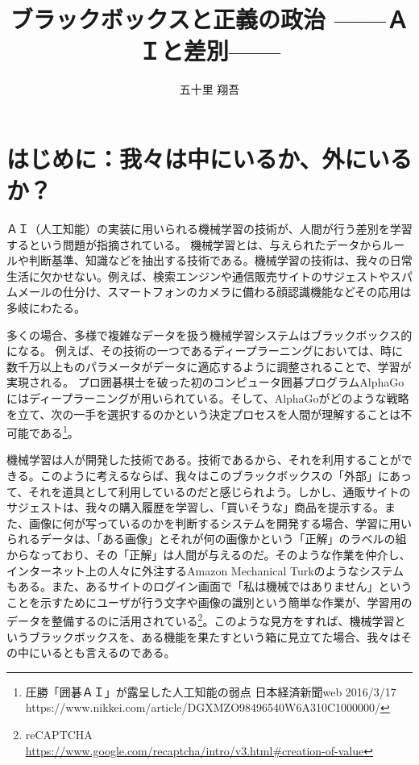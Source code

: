 \documentclass[b5j,twoside,twocolumn]{utarticle}
\title{ブラックボックスと正義の政治 ------ＡＩと差別------}
\author{五十里 翔吾}
\date{\vspace{-5mm}}
\begin{document}

\maketitle


\setlength{\footskip}{-2mm}
\chead[]{}
\lfoot[]{\thepage{}}
\cfoot[]{}
\rfoot[\thepage{}]{}

\thispagestyle{fancy}
\renewcommand{\footnoterule}{\noindent\rule{100mm}{0.3mm}\vskip2mm}


\section{はじめに：我々は中にいるか、外にいるか？}
ＡＩ（人工知能）の実装に用いられる機械学習の技術が、人間が行う差別を学習するという問題が指摘されている。
機械学習とは、与えられたデータからルールや判断基準、知識などを抽出する技術である。機械学習の技術は、我々の日常生活に欠かせない。例えば、検索エンジンや通信販売サイトのサジェストやスパムメールの仕分け、スマートフォンのカメラに備わる顔認識機能などその応用は多岐にわたる。


多くの場合、多様で複雑なデータを扱う機械学習システムはブラックボックス的になる。
例えば、その技術の一つであるディープラーニングにおいては、時に数千万以上ものパラメータがデータに適応するように調整されることで、学習が実現される。
プロ囲碁棋士を破った初のコンピュータ囲碁プログラムAlphaGoにはディープラーニングが用いられている。そして、AlphaGoがどのような戦略を立て、次の一手を選択するのかという決定プロセスを人間が理解することは不可能である\footnote{圧勝「囲碁ＡＩ」が露呈した人工知能の弱点 日本経済新聞web 2016/3/17 https://www.nikkei.com/article/DGXMZO98496540W6A310C1000000/}。


機械学習は人が開発した技術である。技術であるから、それを利用することができる。このように考えるならば、我々はこのブラックボックスの「外部」にあって、それを道具として利用しているのだと感じられよう。しかし、通販サイトのサジェストは、我々の購入履歴を学習し、「買いそうな」商品を提示する。また、画像に何が写っているのかを判断するシステムを開発する場合、学習に用いられるデータは、「ある画像」とそれが何の画像かという「正解」のラベルの組からなっており、その「正解」は人間が与えるのだ。そのような作業を仲介し、インターネット上の人々に外注するAmazon Mechanical Turkのようなシステムもある。また、あるサイトのログイン画面で「私は機械ではありません」ということを示すためにユーザが行う文字や画像の識別という簡単な作業が、学習用のデータを整備するのに活用されている\footnote{reCAPTCHA\\\url{https://www.google.com/recaptcha/intro/v3.html#creation-of-value}}。このような見方をすれば、機械学習というブラックボックスを、ある機能を果たすという箱に見立てた場合、我々はその中にいるとも言えるのである。
\end{document}
